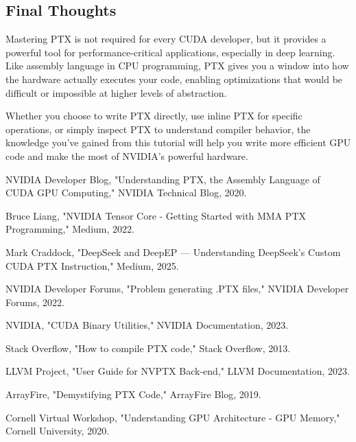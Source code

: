 \subsection{Final Thoughts}

Mastering PTX is not required for every CUDA developer, but it provides a powerful tool for performance-critical applications, especially in deep learning. Like assembly language in CPU programming, PTX gives you a window into how the hardware actually executes your code, enabling optimizations that would be difficult or impossible at higher levels of abstraction.

Whether you choose to write PTX directly, use inline PTX for specific operations, or simply inspect PTX to understand compiler behavior, the knowledge you've gained from this tutorial will help you write more efficient GPU code and make the most of NVIDIA's powerful hardware.


\begin{thebibliography}{9}

 NVIDIA Developer Blog, "Understanding PTX, the Assembly Language of CUDA GPU Computing," NVIDIA Technical Blog, 2020.

 Bruce Liang, "NVIDIA Tensor Core - Getting Started with MMA PTX Programming," Medium, 2022.

 Mark Craddock, "DeepSeek and DeepEP — Understanding DeepSeek's Custom CUDA PTX Instruction," Medium, 2025.

 NVIDIA Developer Forums, "Problem generating .PTX files," NVIDIA Developer Forums, 2022.

 NVIDIA, "CUDA Binary Utilities," NVIDIA Documentation, 2023.

 Stack Overflow, "How to compile PTX code," Stack Overflow, 2013.

 LLVM Project, "User Guide for NVPTX Back-end," LLVM Documentation, 2023.

 ArrayFire, "Demystifying PTX Code," ArrayFire Blog, 2019.

 Cornell Virtual Workshop, "Understanding GPU Architecture - GPU Memory," Cornell University, 2020.

\end{thebibliography}

